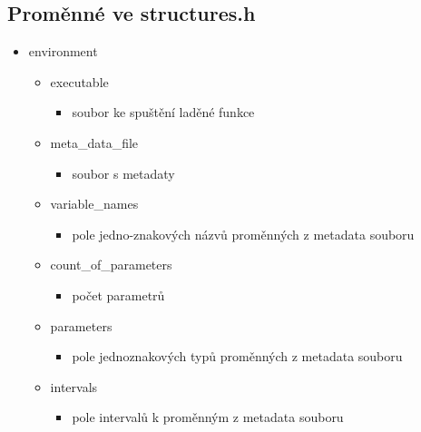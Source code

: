 \documentclass{article}
\begin{document}
\subsection{Proměnné ve structures.h}
\begin{itemize}
\item environment
\begin{itemize}
\item executable
\begin{itemize}
\item soubor ke spuštění laděné funkce
\end{itemize}
\item meta\_data\_file
\begin{itemize}
\item soubor s metadaty
\end{itemize}
\item variable\_names
\begin{itemize}
\item pole jedno-znakových názvů proměnných z metadata souboru
\end{itemize}
\item count\_of\_parameters
\begin{itemize}
\item počet parametrů
\end{itemize}
\item parameters
\begin{itemize}
\item pole jednoznakových typů proměnných z metadata souboru
\end{itemize}
\item intervals
\begin{itemize}
\item pole intervalů k proměnným z metadata souboru
\end{itemize}
\end{itemize}
\end{itemize}
\end{document}

